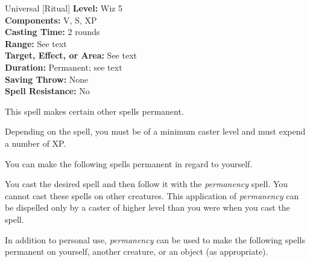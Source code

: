 {Universal [Ritual]}
{
	\textbf{Level:}
	Wiz 5\\
	\textbf{Components:}
	V, S, XP\\
	\textbf{Casting Time:}
	2 rounds\\
	\textbf{Range:}
	See text\\
	\textbf{Target, Effect, or Area:}
	See text\\
	\textbf{Duration:}
	Permanent; see text\\
	\textbf{Saving Throw:}
	None\\
	\textbf{Spell Resistance:}
	No\\
}
{
	This spell makes certain other spells permanent.

	Depending on the spell, you must be of a minimum caster level and must expend a number of XP.

	You can make the following spells permanent in regard to yourself.


	You cast the desired spell and then follow it with the \emph{permanency} spell. You cannot cast these spells on other creatures. This application of \emph{permanency} can be dispelled only by a caster of higher level than you were when you cast the spell.

	In addition to personal use, \emph{permanency} can be used to make the following spells permanent on yourself, another creature, or an object (as appropriate).

}
